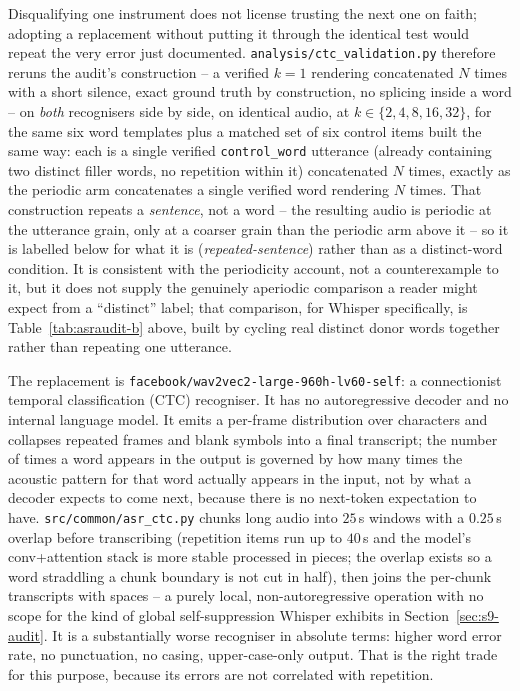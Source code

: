 \documentclass[11pt]{article}
\begin{document}
Disqualifying one instrument does not license trusting the next one on
faith; adopting a replacement without putting it through the identical test
would repeat the very error just documented.
\texttt{analysis/ctc\_validation.py} therefore reruns the audit's
construction -- a verified $k{=}1$ rendering concatenated $N$ times with a
short silence, exact ground truth by construction, no splicing inside a word
-- on \emph{both} recognisers side by side, on identical audio, at
$k\in\{2,4,8,16,32\}$, for the same six word templates plus a matched set of
six control items built the same way: each is a single verified
\texttt{control\_word} utterance (already containing two distinct filler
words, no repetition within it) concatenated $N$ times, exactly as the
periodic arm concatenates a single verified word rendering $N$ times. That
construction repeats a \emph{sentence}, not a word -- the resulting audio is
periodic at the utterance grain, only at a coarser grain than the periodic
arm above it -- so it is labelled below for what it is
(\emph{repeated-sentence}) rather than as a distinct-word condition. It is
consistent with the periodicity account, not a counterexample to it, but it
does not supply the genuinely aperiodic comparison a reader might expect
from a ``distinct'' label; that comparison, for Whisper specifically, is
Table~\ref{tab:asraudit-b} above, built by cycling real distinct donor words
together rather than repeating one utterance.

The replacement is \texttt{facebook/wav2vec2-large-960h-lv60-self}: a
connectionist temporal classification (CTC) recogniser. It has no
autoregressive decoder and no internal language model. It emits a per-frame
distribution over characters and collapses repeated frames and blank symbols
into a final transcript; the number of times a word appears in the output is
governed by how many times the acoustic pattern for that word actually
appears in the input, not by what a decoder expects to come next, because
there is no next-token expectation to have. \texttt{src/common/asr\_ctc.py}
chunks long audio into $25\,$s windows with a $0.25\,$s overlap before
transcribing (repetition items run up to $40\,$s and the model's conv+attention
stack is more stable processed in pieces; the overlap exists so a word
straddling a chunk boundary is not cut in half), then joins the per-chunk
transcripts with spaces -- a purely local, non-autoregressive operation with
no scope for the kind of global self-suppression Whisper exhibits in
Section~\ref{sec:s9-audit}. It is a substantially worse recogniser in
absolute terms: higher word error rate, no punctuation, no casing,
upper-case-only output. That is the right trade for this purpose, because
its errors are not correlated with repetition.
\end{document}
